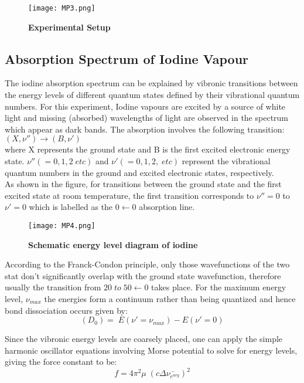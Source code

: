 \begin{figure}[H]
\texttt{[image: MP3.png]}
\caption{\textbf{Experimental Setup}}
\label{fig:2}
\end{figure}

\subsection{Absorption Spectrum of Iodine Vapour}
The iodine absorption spectrum can be explained by vibronic transitions between the energy levels of different quantum states defined by their vibrational quantum numbers. For this experiment, Iodine vapours are excited by a source of white light and missing (absorbed) wavelengths of light are observed in the spectrum which appear as dark bands. The absorption involves the following transition: $(X, \nu'') \rightarrow (B, \nu')$\\
where X represents the ground state and B is the first excited electronic energy state. $\nu'' (=0, 1, 2\; etc)$ and $\nu' (=0,1,2,\; etc)$ represent the vibrational quantum numbers in the ground and excited electronic states, respectively.\\
As shown in the figure, for transitions between the ground state and the first excited state at room temperature, the first transition corresponds to $\nu'' =0$ to $\nu' = 0$ which is labelled as the $0\leftarrow0$ absorption line.\\

\begin{figure}[H]
\texttt{[image: MP4.png]}
\caption{\textbf{Schematic energy level diagram of iodine}}
\label{fig3}
\end{figure}

According to the Franck-Condon principle, only those wavefunctions of the two stat don't significantly overlap with the ground state wavefunction, therefore usually the transition from $20\; to\;50\leftarrow0$ takes place. For the maximum energy level, $\nu_{max}$ the energies form a continuum rather than being quantized and hence bond dissociation occurs given by:
$$(D_0)=\;E(\nu'=\nu_{max})-E(\nu'=0)$$

Since the vibronic energy levels are coarsely placed, one can apply the simple harmonic oscillator equations involving Morse potential to solve for energy levels, giving the force constant to be: 
$$f=4\pi^2 \mu\;(c\Delta\bar{\nu_{e^{avg}}})^2$$
